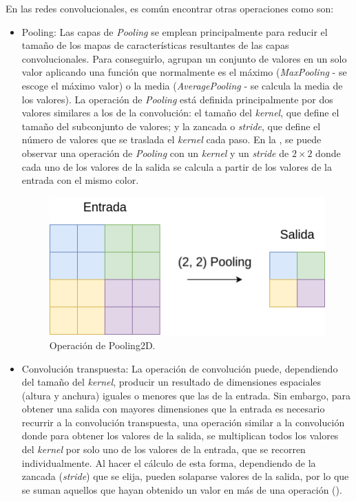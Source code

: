 En las redes convolucionales, es común encontrar otras operaciones como son:
\begin{itemize}
\item Pooling: Las capas de \textit{Pooling} se emplean principalmente para reducir el tamaño de los mapas de características resultantes de las capas convolucionales. Para conseguirlo, agrupan un conjunto de valores en un solo valor aplicando una función que normalmente es el máximo (\textit{MaxPooling} - se escoge el máximo valor) o la media (\textit{AveragePooling} - se calcula la media de los valores). La operación de \textit{Pooling} está definida principalmente por dos valores similares a los de la convolución: el tamaño del \textit{kernel}, que define el tamaño del subconjunto de valores; y la zancada o \textit{stride}, que define el número de valores que se traslada el \textit{kernel} cada paso. En la , se puede observar una operación de \textit{Pooling} con un \textit{kernel} y un \textit{stride} de $2\times2$ donde cada uno de los valores de la salida se calcula a partir de los valores de la entrada con el mismo color.

\begin{figure}[H]
\centering
\includegraphics[width=0.5\linewidth]{imagenes/pooling.png} 
\captionsetup{width=.5\linewidth}
\caption{Operación de Pooling2D.}
\label{fig:pooling}
\end{figure}

\item Convolución transpuesta: La operación de convolución puede, dependiendo del tamaño del \textit{kernel}, producir un resultado de dimensiones espaciales (altura y anchura) iguales o menores que las de la entrada. Sin embargo, para obtener una salida con mayores dimensiones que la entrada es necesario recurrir a la convolución transpuesta, una operación similar a la convolución donde para obtener los valores de la salida, se multiplican todos los valores del \textit{kernel} por solo uno de los valores de la entrada, que se recorren individualmente. Al hacer el cálculo de esta forma, dependiendo de la zancada (\textit{stride}) que se elija, pueden solaparse valores de la salida, por lo que se suman aquellos que hayan obtenido un valor en más de una operación ().


\end{itemize}
